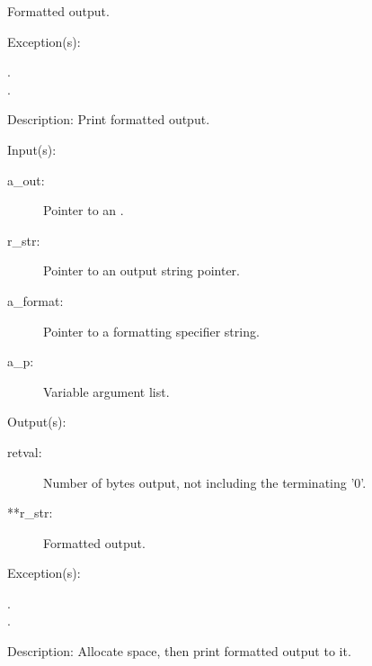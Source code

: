 \begin{capi}
\begin{capilist}
\begin{description}
			Formatted output.
		\end{description}
	\item[Exception(s): ]
		\begin{description}\item[]
		\item[.]
		\item[.]
		\end{description}
	\item[Description: ]
		Print formatted output.
	\end{capilist}
\label{out_put_sva}
	\begin{capilist}
	\item[Input(s): ]
		\begin{description}\item[]
		\item[a\_out: ]
			Pointer to an .
		\item[r\_str: ]
			Pointer to an output string pointer.
		\item[a\_format: ]
			Pointer to a formatting specifier string.
		\item[a\_p: ]
			Variable argument list.
		\end{description}
	\item[Output(s): ]
		\begin{description}\item[]
		\item[retval: ]
			Number of bytes output, not including the terminating
			'{\bs}0'.
		\item[**r\_str: ]
			Formatted output.
		\end{description}
	\item[Exception(s): ]
		\begin{description}\item[]
		\item[.]
		\item[.]
		\end{description}
	\item[Description: ]
		Allocate space, then print formatted output to it.
	\end{capilist}
\label{out_put_svn}

\end{capi}

